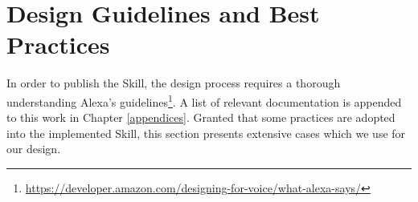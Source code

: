 %
%
%
%
%
%
%
%
%
%
%
%
%
%
%
%
%
%





\section{Design Guidelines and Best Practices}
\label{designGuide}


In order to publish the Skill, the design process requires a thorough understanding Alexa's guidelines\footnote{ {\url{https://developer.amazon.com/designing-for-voice/what-alexa-says/}}}. A list of relevant documentation is appended to this work in Chapter \ref{appendices}. Granted that some practices are adopted into the implemented Skill, this section presents extensive cases which we use for our design.\\
%




